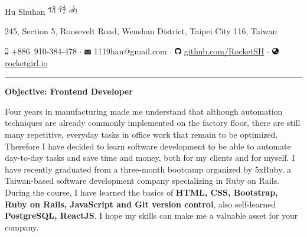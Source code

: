 \documentclass[a4paper,10pt]{article}
\begin{document}
\pagestyle{empty} %
\frenchspacing


\begin{center}
  \Huge{Hu Shuhan \includegraphics[height=1.2em,trim=0 10mm 0 -1cm]{shared/signature.png}}\par

\normalsize 245, Section 5, Roosevelt Road, Wenshan District, Taipei City 116, Taiwan 

  \includegraphics[height=0.7em]{shared/mobile-alt.eps} +886~910-384-478 $\cdot$
  \includegraphics[width=0.8em]{shared/envelope.eps} 1119han@gmail.com $\cdot$
  \includegraphics[width=0.8em]{shared/github.eps}
  \href{https://github.com/RocketSH}{github.com/RocketSH} $\cdot$
  \includegraphics[width=0.8em]{shared/globe-asia.eps} \href{https://rocketgirl.io/}{rocketgirl.io}

\rule{15.2cm}{0.05em}
\vspace*{.5em}
\begin{center}
  \large{\textbf{Objective: Frontend Developer}}
\end{center}
\vspace*{.5em}

\begin{center}
  \begin{minipage}{0.9\textwidth}
Four years in manufacturing made me understand that although automation techniques are already commonly
implemented on the factory floor, there are still many repetitive, everyday tasks in office work that remain to be optimized. Therefore I have decided to
learn software development to be able to automate day-to-day tasks and save time and money, both for my clients and for myself.
\vspace*{1em}
I have recently graduated from a three-month bootcamp organized by 5xRuby, a Taiwan-based
software development company specializing in Ruby on Rails.
During the course, I have learned the basics of \textbf{HTML, CSS, Bootstrap, Ruby on
          Rails, JavaScript and Git version control}, also self-learned
        \textbf{PostgreSQL, ReactJS}.
I hope my skills can make me a valuable asset for your company.
\end{minipage}
\end{center}


\end{center}
\end{document}

